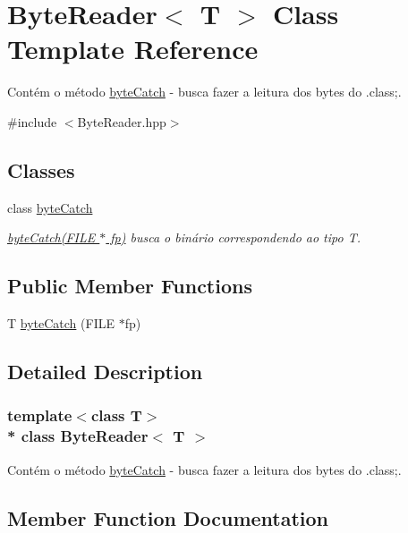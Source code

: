 \hypertarget{class_byte_reader}{}\section{Byte\+Reader$<$ T $>$ Class Template Reference}
\label{class_byte_reader}


Contém o método \hyperlink{class_byte_reader_1_1byte_catch}{byte\+Catch} -\/ busca fazer a leitura dos bytes do .class;.  




{\ttfamily \#include $<$Byte\+Reader.\+hpp$>$}

\subsection*{Classes}
\begin{DoxyCompactItemize}
\item 
class \hyperlink{class_byte_reader_1_1byte_catch}{byte\+Catch}
\begin{DoxyCompactList}\small\item\em \hyperlink{class_byte_reader_ae570748805994596f51ae033183935d7}{byte\+Catch(\+F\+I\+L\+E $\ast$ fp)} busca o binário correspondendo ao tipo T. \end{DoxyCompactList}\end{DoxyCompactItemize}
\subsection*{Public Member Functions}
\begin{DoxyCompactItemize}
\item 
T \hyperlink{class_byte_reader_ae570748805994596f51ae033183935d7}{byte\+Catch} (F\+I\+LE $\ast$fp)
\end{DoxyCompactItemize}


\subsection{Detailed Description}
\subsubsection*{template$<$class T$>$\\*
class Byte\+Reader$<$ T $>$}

Contém o método \hyperlink{class_byte_reader_1_1byte_catch}{byte\+Catch} -\/ busca fazer a leitura dos bytes do .class;. 

\subsection{Member Function Documentation}
